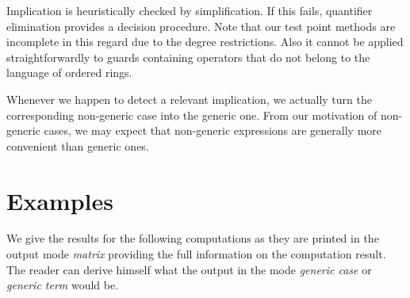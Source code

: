 Implication is heuristically checked by simplification. If this fails,
quantifier elimination provides a decision procedure. Note that our
test point methods are incomplete in this regard due to the degree
restrictions. Also it cannot be applied straightforwardly to guards
containing operators that do not belong to the language of ordered
rings.

Whenever we happen to detect a relevant implication, we actually turn
the corresponding non-generic case into the generic one. From our
motivation of non-generic cases, we may expect that non-generic
expressions are generally more convenient than generic ones.
%
\section{Examples}\label{examples}
We give the results for the following computations as they are printed
in the output mode {\em matrix} providing the full information on the
computation result. The reader can derive himself what the output in
the mode {\em generic case} or {\em generic term} would be.
